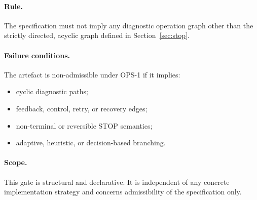 \paragraph{Rule.}
The specification must not imply any diagnostic operation graph other than the
strictly directed, acyclic graph defined in Section~\ref{sec:stop}.

\paragraph{Failure conditions.}
The artefact is non-admissible under OPS-1 if it implies:
\begin{itemize}
  \item cyclic diagnostic paths;
  \item feedback, control, retry, or recovery edges;
  \item non-terminal or reversible STOP semantics;
  \item adaptive, heuristic, or decision-based branching.
\end{itemize}

\paragraph{Scope.}
This gate is structural and declarative. It is independent of any concrete
implementation strategy and concerns admissibility of the specification only.
